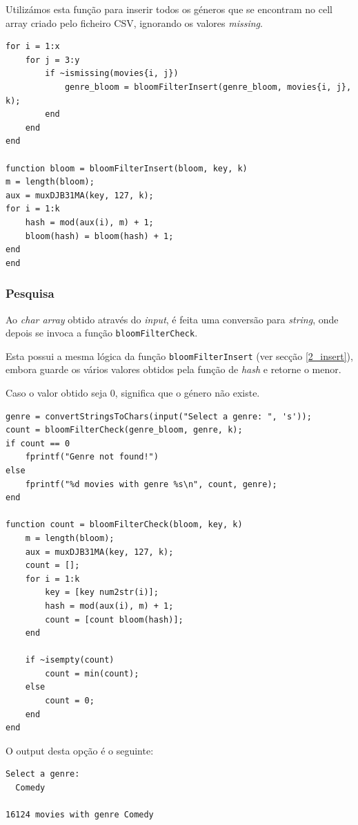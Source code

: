 \documentclass[portuguese, 11pt, a4paper,titlepage, oneside]{article}
\begin{document}
Utilizámos esta função para inserir todos os géneros que se encontram no cell array criado pelo ficheiro CSV, ignorando os valores \textit{missing}.

\begin{lstlisting}[style=Matlab-editor]
  for i = 1:x
    for j = 3:y
        if ~ismissing(movies{i, j})
            genre_bloom = bloomFilterInsert(genre_bloom, movies{i, j}, k);
        end
    end
end

function bloom = bloomFilterInsert(bloom, key, k)
m = length(bloom);
aux = muxDJB31MA(key, 127, k);
for i = 1:k
    hash = mod(aux(i), m) + 1;
    bloom(hash) = bloom(hash) + 1;
end
end
\end{lstlisting}

\subsubsection{Pesquisa}
Ao \textit{char array} obtido através do \textit{input}, é feita uma conversão para \textit{string}, onde depois se invoca a função \verb|bloomFilterCheck|.

Esta possui a mesma lógica da função \verb|bloomFilterInsert| (ver secção \ref{2_insert}), embora guarde os vários valores obtidos pela função de \textit{hash} e retorne o menor.

Caso o valor obtido seja 0, significa que o género não existe.

\begin{lstlisting}[style=Matlab-editor]
genre = convertStringsToChars(input("Select a genre: ", 's'));
count = bloomFilterCheck(genre_bloom, genre, k);
if count == 0
    fprintf("Genre not found!")
else
    fprintf("%d movies with genre %s\n", count, genre);
end

function count = bloomFilterCheck(bloom, key, k)
    m = length(bloom);
    aux = muxDJB31MA(key, 127, k);
    count = [];
    for i = 1:k
        key = [key num2str(i)];
        hash = mod(aux(i), m) + 1;
        count = [count bloom(hash)];
    end
    
    if ~isempty(count)
        count = min(count);
    else
        count = 0;
    end
end
\end{lstlisting}

O output desta opção é o seguinte:
\begin{lstlisting}[style=Matlab-editor]
Select a genre: 
  Comedy

16124 movies with genre Comedy
\end{lstlisting}
\end{document}
